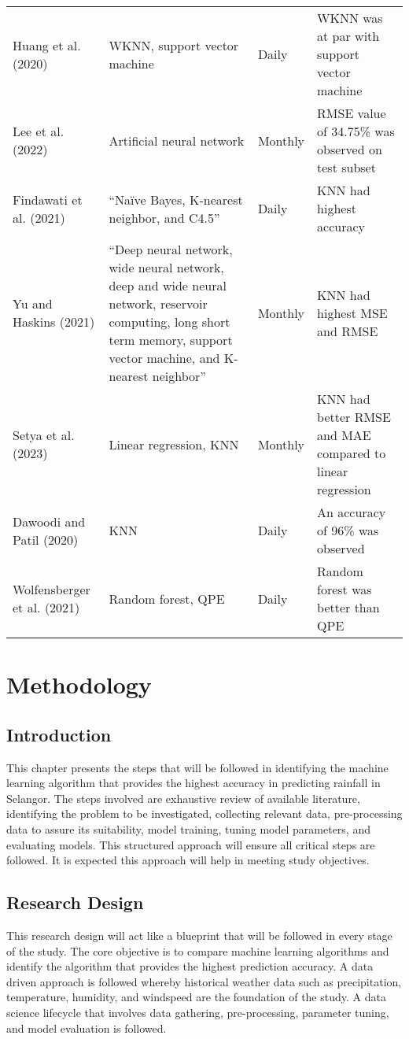 \documentclass{article}
\begin{document}
\begin{table}[h]
\begin{tabular}{llll}
Huang et al. (2020) & WKNN, support vector machine & Daily & WKNN was at par with support vector machine \\
Lee et al. (2022) & Artificial neural network & Monthly & RMSE value of 34.75\% was observed on test subset \\
Findawati et al. (2021) & “Naïve Bayes, K-nearest neighbor, and C4.5” & Daily & KNN had highest accuracy \\
Yu and Haskins (2021) & “Deep neural network, wide neural network, deep and wide neural network, reservoir computing, long short term memory, support vector machine, and K-nearest neighbor” & Monthly & KNN had highest MSE and RMSE \\
Setya et al. (2023) & Linear regression, KNN & Monthly & KNN had better RMSE and MAE compared to linear regression \\
Dawoodi and Patil (2020) & KNN & Daily & An accuracy of 96\% was observed \\
Wolfensberger et al. (2021) & Random forest, QPE & Daily & Random forest was better than QPE \\
\bottomrule
\end{tabular}
\end{table}

\section{Methodology}

\subsection{Introduction}

This chapter presents the steps that will be followed in identifying the machine learning
algorithm that provides the highest accuracy in predicting rainfall in Selangor. The steps
involved are exhaustive review of available literature, identifying the problem to be
investigated, collecting relevant data, pre-processing data to assure its suitability, model
training, tuning model parameters, and evaluating models. This structured approach will ensure
all critical steps are followed. It is expected this approach will help in meeting study objectives.

\subsection{Research Design}

This research design will act like a blueprint that will be followed in every stage of the
study. The core objective is to compare machine learning algorithms and identify the algorithm
that provides the highest prediction accuracy. A data driven approach is followed whereby
historical weather data such as precipitation, temperature, humidity, and windspeed are the
foundation of the study. A data science lifecycle that involves data gathering, pre-processing,
parameter tuning, and model evaluation is followed.
\end{document}
